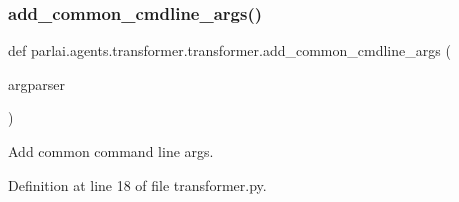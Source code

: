\subsubsection{\texorpdfstring{add\+\_\+common\+\_\+cmdline\+\_\+args()}{add\_common\_cmdline\_args()}}
{\footnotesize\ttfamily def parlai.\+agents.\+transformer.\+transformer.\+add\+\_\+common\+\_\+cmdline\+\_\+args (\begin{DoxyParamCaption}\item[{}]{argparser }\end{DoxyParamCaption})}

\begin{DoxyVerb}Add common command line args.
\end{DoxyVerb}
 

Definition at line 18 of file transformer.\+py.


